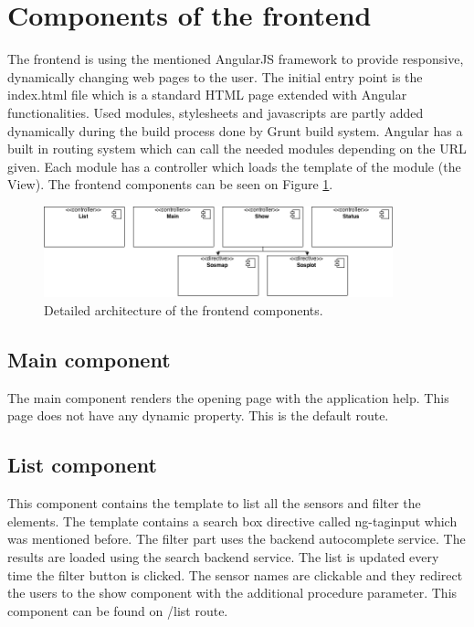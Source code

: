 \section{Components of the frontend}

The frontend is using the mentioned AngularJS framework to provide responsive, dynamically changing web pages to the user. The initial entry point is the index.html file which is a standard HTML page extended with Angular functionalities. Used modules, stylesheets and javascripts are partly added dynamically during the build process done by Grunt build system. 
Angular has a built in routing system which can call the needed modules depending on the URL given. Each module has a controller which loads the template of the module (the View). The frontend components can be seen on Figure \ref{fig:frontarch}.


\begin{figure}[h]
\centering
\includegraphics[width=0.9\textwidth]{figures/frontend.png}
\caption{Detailed architecture of the frontend components.\label{fig:frontarch}}
\end{figure}

\subsection{Main component}
The main component renders the opening page with the application help. This page does not have any dynamic property. This is the default route.

\subsection{List component}
This component contains the template to list all the sensors and filter the elements. The template contains a search box directive called ng-taginput which was mentioned before. The filter part uses the backend autocomplete service. The results are loaded using the search backend service. The list is updated every time the filter button is clicked.
The sensor names are clickable and they redirect the users to the show component with the additional procedure parameter. This component can be found on /list route.

